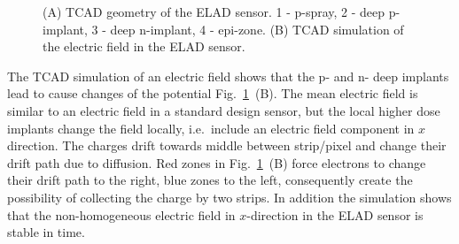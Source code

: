 \begin{figure}[t]
\begin{minipage}[h]{0.5\linewidth}
\end{minipage}
\hfill 
\begin{minipage}[h]{0.5\linewidth}
\end{minipage}
\caption[short description here]
 {(A) TCAD geometry of the ELAD sensor. 1 - p-spray, 2 - deep p-implant, 3 - deep n-implant, 4 - epi-zone. 
 (B) TCAD simulation of the electric field in the ELAD sensor. 
 }
\label{fig:geo-elfield}
\end{figure}

The TCAD simulation of an electric field shows that the p- and n- deep implants lead to cause changes of the potential Fig.~\ref{fig:geo-elfield}~(B). 
The mean electric field is similar to an electric field in a standard design sensor, but the local higher dose implants change the field locally, i.e.\ include an electric field component in $x$ direction. 
The charges drift towards middle between strip/pixel and change their drift path due to diffusion.
Red zones in Fig.~\ref{fig:geo-elfield}~(B) force electrons to change their drift path to the right, blue zones to the left, consequently create the possibility of collecting the charge by two strips. 
In addition the simulation shows that the non-homogeneous electric field in $x$-direction in the ELAD sensor is stable in time. 


